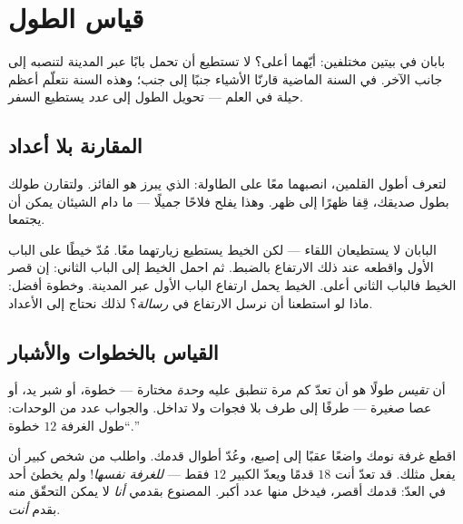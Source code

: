\chapter{قياس الطول}\label{ch:g2:measuring-length}

بابان في بيتين مختلفين: أيّهما أعلى؟ لا تستطيع أن تحمل بابًا عبر
المدينة لتنصبه إلى جانب الآخر. في السنة الماضية قارنّا الأشياء
جنبًا إلى جنب؛ وهذه السنة نتعلّم أعظم حيلة في العلم --- تحويل
الطول إلى \emph{عدد} يستطيع السفر.

\section{المقارنة بلا أعداد}

\begin{example}\label{ex:g2:measuring-length:sidebyside}
لتعرف أطول القلمين، انصبهما معًا على الطاولة: الذي يبرز هو الفائز.
ولتقارن طولك بطول صديقك، قِفا ظهرًا إلى ظهر. وهذا يفلح فلاحًا
جميلًا --- ما دام الشيئان يمكن أن يجتمعا.
\end{example}

\begin{example}\label{ex:g2:measuring-length:string}
البابان لا يستطيعان اللقاء --- لكن الخيط يستطيع زيارتهما معًا. مُدّ
خيطًا على الباب الأول واقطعه عند ذلك الارتفاع بالضبط. ثم احمل
الخيط إلى الباب الثاني: إن قصر الخيط فالباب الثاني أعلى. الخيط
يحمل ارتفاع الباب الأول عبر المدينة. وخطوة أفضل: ماذا لو استطعنا
أن نرسل الارتفاع في \emph{رسالة}؟ لذلك نحتاج إلى الأعداد.
\end{example}

\section{القياس بالخطوات والأشبار}

\begin{definition}\label{def:g2:measuring-length:measure}
أن \emph{تقيس} طولًا هو أن تعدّ كم مرة تنطبق عليه
\emph{وحدة} مختارة --- خطوة، أو شبر يد، أو عصا صغيرة
--- طرفًا إلى طرف بلا فجوات ولا تداخل. والجواب عدد من الوحدات:
``طول الغرفة $12$ خطوة.''
\end{definition}

\begin{example}\label{ex:g2:measuring-length:pace}
اقطع غرفة نومك واضعًا عقبًا إلى إصبع، وعُدّ أطوال قدمك. واطلب من
شخص كبير أن يفعل مثلك. قد تعدّ أنت $18$ قدمًا ويعدّ الكبير $12$
فقط --- \emph{للغرفة نفسها}! ولم يخطئ أحد في العدّ: قدمك أقصر،
فيدخل منها عدد أكبر.  المصنوع بقدمي \emph{أنا} لا يمكن
التحقّق منه بقدم \emph{أنت}.
\end{example}

